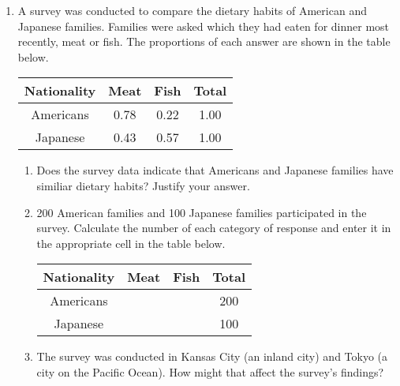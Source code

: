 \documentclass[12pt, twoside]{article}
\begin{document}
\begin{enumerate}[itemsep=0.5cm]
\newpage
\item A survey was conducted to compare the dietary habits of American and Japanese families. Families were asked which they had eaten for dinner most recently, meat or fish. The proportions of each answer are shown in the table below.
    \begin{center}
        \begin{tabular}{|c|c|c|c|}
            \hline
            Nationality & Meat & Fish & Total \\[0.2cm]
            \hline
            Americans & 0.78 & 0.22 & 1.00 \\[0.25cm]
            \hline
            Japanese & 0.43 & 0.57 & 1.00 \\[0.25cm]
            \hline
        \end{tabular}
    \end{center}
    \begin{enumerate}
        \item Does the survey data indicate that Americans and Japanese families have similiar dietary habits? Justify your answer. \vspace{2cm}
        \item 200 American families and 100 Japanese families participated in the survey. Calculate the number of each category of response and enter it in the appropriate cell in the table below. 
        \begin{center}
            \begin{tabular}{|c|p{1.5cm}|p{1.5cm}|c|}
                \hline
                Nationality & \; Meat & \; Fish & Total \\[0.2cm]
                \hline
                Americans & &  & 200 \\[0.25cm]
                \hline
                Japanese & &  & 100 \\[0.25cm]
                \hline
            \end{tabular}
        \end{center}
        \item The survey was conducted in Kansas City (an inland city) and Tokyo (a city on the Pacific Ocean). How might that affect the survey's findings? 
    \end{enumerate} \vspace{3cm}


\end{enumerate}
\end{document}
